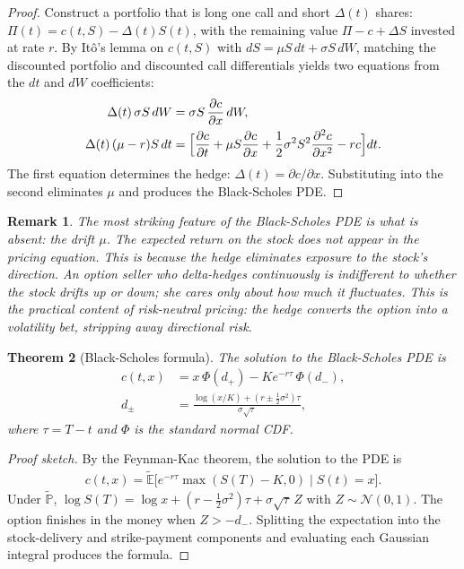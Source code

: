 \documentclass{report}
\theoremstyle{spacedplain}
\newtheorem{theorem}{Theorem}[section]
\theoremstyle{spaceddefinition}
\theoremstyle{spacedremark}
\newtheorem{remark}[theorem]{Remark}
\begin{document}
\begin{proof}
Construct a portfolio that is long one call and short $\Delta(t)$ shares: $\Pi(t) = c(t,S) - \Delta(t) S(t)$, with the remaining value $\Pi - c + \Delta S$ invested at rate $r$. By It\^o's lemma on $c(t,S)$ with $dS = \mu S\,dt + \sigma S\,dW$, matching the discounted portfolio and discounted call differentials yields two equations from the $dt$ and $dW$ coefficients:
\begin{align}
    \Delta(t)\,\sigma S\,dW &= \sigma S\,\frac{\partial c}{\partial x}\,dW, \\
    \Delta(t)\,(\mu-r)S\,dt &= \Bigl[\frac{\partial c}{\partial t} + \mu S\frac{\partial c}{\partial x} + \frac{1}{2}\sigma^2 S^2\frac{\partial^2 c}{\partial x^2} - rc\Bigr]dt.
\end{align}
The first equation determines the hedge: $\Delta(t) = \partial c/\partial x$. Substituting into the second eliminates $\mu$ and produces the Black-Scholes PDE.
\end{proof}

\begin{remark}
The most striking feature of the Black-Scholes PDE is what is absent: the drift $\mu$. The expected return on the stock does not appear in the pricing equation. This is because the hedge eliminates exposure to the stock's direction. An option seller who delta-hedges continuously is indifferent to whether the stock drifts up or down; she cares only about how much it fluctuates. This is the practical content of risk-neutral pricing: the hedge converts the option into a volatility bet, stripping away directional risk.
\end{remark}


\begin{theorem}[Black-Scholes formula]
The solution to the Black-Scholes PDE is
\begin{align}
    c(t,x) &= x\,\Phi(d_+) - K e^{-r\tau}\,\Phi(d_-), \\
    d_{\pm} &= \frac{\log(x/K) + (r \pm \frac{1}{2}\sigma^2)\tau}{\sigma\sqrt{\tau}},
\end{align}
where $\tau = T - t$ and $\Phi$ is the standard normal CDF.
\end{theorem}

\begin{proof}[Proof sketch]
By the Feynman-Kac theorem, the solution to the PDE is
\begin{align}
    c(t,x) = \widetilde{\mathbb{E}}\bigl[e^{-r\tau}\max(S(T)-K,0)\;\big|\;S(t)=x\bigr].
\end{align}
Under $\widetilde{\mathbb{P}}$, $\log S(T) = \log x + (r - \frac{1}{2}\sigma^2)\tau + \sigma\sqrt{\tau}\,Z$ with $Z \sim \mathcal{N}(0,1)$. The option finishes in the money when $Z > -d_-$. Splitting the expectation into the stock-delivery and strike-payment components and evaluating each Gaussian integral produces the formula.
\end{proof}
\end{document}
